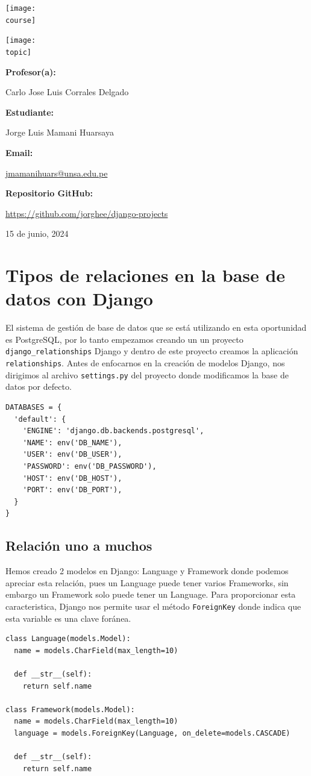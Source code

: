 \documentclass[10pt, a4paper]{article}
\makeatletter
\newcommand{\mpy}[1]{\texttt{#1}}
\newcommand{\course}{img/web_programming.png}
\newcommand{\topic}{img/relationship_pdf_emails.png}
\newcommand{\professor}{Carlo Jose Luis Corrales Delgado}
\newcommand{\student}{Jorge Luis Mamani Huarsaya}
\newcommand{\email}{https://mail.google.com/mail/u/0/?fs=1&tf=cm&source=mailto&to=jmamanihuars@unsa.edu.pe}
\newcommand{\github}{https://github.com/jorghee/django-projects}
\newcommand{\mydate}{15 de junio, 2024}
\makeatother
\begin{document}
\begin{titlepage}
	\centering
	\texttt{[image: \\course]} \par
  \vfill \vfill
	\texttt{[image: \\topic]}\par
  \vfill \vfill
  {\textbf{Profesor(a):} \par}
	\professor \vfill
  {\textbf{Estudiante:} \par}
	\student \vfill
  {\textbf{Email:} \par}
  \href{\email}{jmamanihuars@unsa.edu.pe} \vfill
  {\textbf{Repositorio GitHub:} \par}
  \href{\github}{\github} \vfill
	{\large \mydate \par}
\end{titlepage}

\section{Tipos de relaciones en la base de datos con Django}
El sistema de gestión de base de datos que se está utilizando en esta oportunidad es PostgreSQL, por lo tanto empezamos creando un un proyecto \mpy{django_relationships} Django y dentro de este proyecto creamos la aplicación \mpy{relationships}. Antes de enfocarnos en la creación de modelos Django, nos dirigimos al archivo \mpy{settings.py} del proyecto donde modificamos la base de datos por defecto.

\begin{verbatim}
DATABASES = {
  'default': {
    'ENGINE': 'django.db.backends.postgresql',
    'NAME': env('DB_NAME'),
    'USER': env('DB_USER'),
    'PASSWORD': env('DB_PASSWORD'),
    'HOST': env('DB_HOST'),
    'PORT': env('DB_PORT'),
  }
}
\end{verbatim}

\subsection{Relación uno a muchos}
Hemos creado 2 modelos en Django: Language y Framework donde podemos apreciar esta relación, pues un Language puede tener varios Frameworks, sin embargo un Framework solo puede tener un Language. Para proporcionar esta caracteristica, Django nos permite usar el método \mpy{ForeignKey} donde indica que esta variable es una clave foránea.

\begin{verbatim}
class Language(models.Model):
  name = models.CharField(max_length=10)

  def __str__(self):
    return self.name

class Framework(models.Model):
  name = models.CharField(max_length=10)
  language = models.ForeignKey(Language, on_delete=models.CASCADE)

  def __str__(self):
    return self.name
\end{verbatim}
\end{document}
